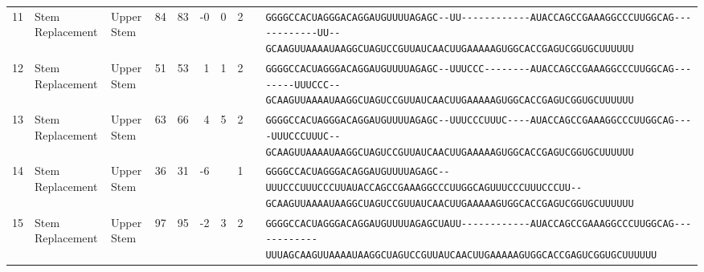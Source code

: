 \begin{tabular}{rllrrrrrcl}
 11 & Stem Replacement & Upper Stem & 84 & 83 & -0 & 0 & 2 &  &
 \color{ucsfdarkgrey}\verb|GGGGCCACUAGGGACAGGAU|\color{ucsforange}\verb|GUUUUA|\color{ucsfblue}\verb|GAGC--UU------------|\color{ucsfpurple}\verb|AUACCAGCCGAAAGGCCCUUGGCAG|\color{ucsfblue}\verb|------------UU--GCAAGU|\color{ucsforange}\verb|UAAAAUAA|\color{ucsfnavy}\verb|GGCUAGUCC|\color{ucsforange}\verb|GUUAUCA|\color{ucsfteal}\verb|ACUUGAAAAAGU|\color{ucsforange}\verb|GGCACCGAGUCGGUGCUUUUUU| \\

 12 & Stem Replacement & Upper Stem & 51 & 53 & 1 & 1 & 2 &  &
 \color{ucsfdarkgrey}\verb|GGGGCCACUAGGGACAGGAU|\color{ucsforange}\verb|GUUUUA|\color{ucsfblue}\verb|GAGC--UUUCCC--------|\color{ucsfpurple}\verb|AUACCAGCCGAAAGGCCCUUGGCAG|\color{ucsfblue}\verb|--------UUUCCC--GCAAGU|\color{ucsforange}\verb|UAAAAUAA|\color{ucsfnavy}\verb|GGCUAGUCC|\color{ucsforange}\verb|GUUAUCA|\color{ucsfteal}\verb|ACUUGAAAAAGU|\color{ucsforange}\verb|GGCACCGAGUCGGUGCUUUUUU| \\

 13 & Stem Replacement & Upper Stem & 63 & 66 & 4 & 5 & 2 &  &
 \color{ucsfdarkgrey}\verb|GGGGCCACUAGGGACAGGAU|\color{ucsforange}\verb|GUUUUA|\color{ucsfblue}\verb|GAGC--UUUCCCUUUC----|\color{ucsfpurple}\verb|AUACCAGCCGAAAGGCCCUUGGCAG|\color{ucsfblue}\verb|----UUUCCCUUUC--GCAAGU|\color{ucsforange}\verb|UAAAAUAA|\color{ucsfnavy}\verb|GGCUAGUCC|\color{ucsforange}\verb|GUUAUCA|\color{ucsfteal}\verb|ACUUGAAAAAGU|\color{ucsforange}\verb|GGCACCGAGUCGGUGCUUUUUU| \\

 14 & Stem Replacement & Upper Stem & 36 & 31 & -6 &  & 1 &  &
 \color{ucsfdarkgrey}\verb|GGGGCCACUAGGGACAGGAU|\color{ucsforange}\verb|GUUUUA|\color{ucsfblue}\verb|GAGC--UUUCCCUUUCCCUU|\color{ucsfpurple}\verb|AUACCAGCCGAAAGGCCCUUGGCAG|\color{ucsfblue}\verb|UUUCCCUUUCCCUU--GCAAGU|\color{ucsforange}\verb|UAAAAUAA|\color{ucsfnavy}\verb|GGCUAGUCC|\color{ucsforange}\verb|GUUAUCA|\color{ucsfteal}\verb|ACUUGAAAAAGU|\color{ucsforange}\verb|GGCACCGAGUCGGUGCUUUUUU| \\

 15 & Stem Replacement & Upper Stem & 97 & 95 & -2 & 3 & 2 &  &
 \color{ucsfdarkgrey}\verb|GGGGCCACUAGGGACAGGAU|\color{ucsforange}\verb|GUUUUA|\color{ucsfblue}\verb|GAGCUAUU------------|\color{ucsfpurple}\verb|AUACCAGCCGAAAGGCCCUUGGCAG|\color{ucsfblue}\verb|------------UUUAGCAAGU|\color{ucsforange}\verb|UAAAAUAA|\color{ucsfnavy}\verb|GGCUAGUCC|\color{ucsforange}\verb|GUUAUCA|\color{ucsfteal}\verb|ACUUGAAAAAGU|\color{ucsforange}\verb|GGCACCGAGUCGGUGCUUUUUU| \\


\end{tabular}
